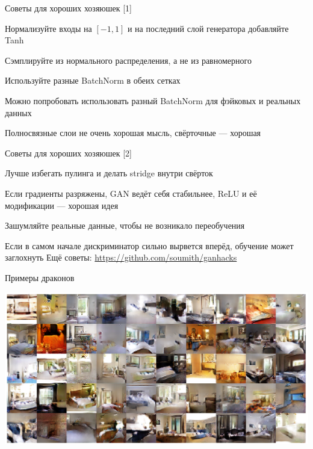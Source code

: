 \documentclass[notes,12pt, aspectratio=169]{beamer}
\newenvironment{wideitemize}{\itemize\addtolength{\itemsep}{10pt}}{\enditemize}
\begin{document}
\begin{frame}{Советы для хороших хозяюшек [1]}
\begin{wideitemize}
	\item   Нормализуйте входы на $[-1, 1]$ и на последний слой генератора добавляйте Tanh 
	\item   Сэмплируйте из нормального распределения, а не из равномерного
	\item   Используйте разные BatchNorm  в обеих сетках 
	\item   Можно попробовать использовать разный BatchNorm  для фэйковых и реальных данных 
	\item   Полносвязные слои не очень хорошая мысль, свёрточные — хорошая
\end{wideitemize}
\end{frame}


\begin{frame}{Советы для хороших хозяюшек [2]}
\begin{wideitemize}
\item   Лучше избегать пулинга и делать stridge внутри свёрток 
\item   Если градиенты разряжены, GAN ведёт себя стабильнее,  ReLU и её модификации — хорошая идея 
\item   Зашумляйте реальные данные, чтобы не возникало переобучения
\item   Если в самом начале дискриминатор сильно вырвется вперёд, обучение может заглохнуть
\end{wideitemize}
\vfill
\footnotesize
Ещё советы:  {\color{blue} \url{https://github.com/soumith/ganhacks}}
\end{frame}


\begin{frame}{Примеры драконов}
\begin{center}
\centering	\includegraphics[width=.9\linewidth]{interiers.png}
\end{center}
\end{frame}
\end{document}
